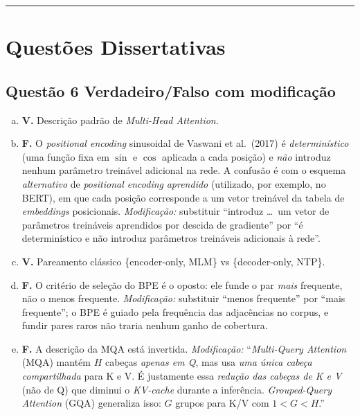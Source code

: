 \documentclass[11pt,a4paper]{article}
\begin{document}
\color{black}
\rule{\linewidth}{0.4pt}

\section*{Questões Dissertativas}

\color{blue}

\subsection*{Questão 6 \textemdash{} Verdadeiro/Falso com modificação}

\begin{enumerate}[a)]
    \item \textbf{V.} Descrição padrão de \textit{Multi-Head Attention}.

    \item \textbf{F.} O \textit{positional encoding} sinusoidal de Vaswani et al.\ (2017) é \emph{determinístico} (uma função fixa em $\sin$ e $\cos$ aplicada a cada posição) e \emph{não} introduz nenhum parâmetro treinável adicional na rede. A confusão é com o esquema \emph{alternativo} de \textit{positional encoding} \emph{aprendido} (utilizado, por exemplo, no BERT), em que cada posição corresponde a um vetor treinável da tabela de \textit{embeddings} posicionais. \textit{Modificação:} substituir ``introduz \ldots\ um vetor de parâmetros treináveis aprendidos por descida de gradiente'' por ``é determinístico e não introduz parâmetros treináveis adicionais à rede''.

    \item \textbf{V.} Pareamento clássico \{encoder-only, MLM\} vs \{decoder-only, NTP\}.

    \item \textbf{F.} O critério de seleção do BPE é o oposto: ele funde o par \emph{mais} frequente, não o menos frequente. \textit{Modificação:} substituir ``menos frequente'' por ``mais frequente''; o BPE é guiado pela frequência das adjacências no corpus, e fundir pares raros não traria nenhum ganho de cobertura.

    \item \textbf{F.} A descrição da MQA está invertida. \textit{Modificação:} ``\textit{Multi-Query Attention} (MQA) mantém $H$ cabeças \emph{apenas em Q}, mas usa \emph{uma única cabeça compartilhada} para K e V. É justamente essa \emph{redução das cabeças de K e V} (não de Q) que diminui o \textit{KV-cache} durante a inferência. \textit{Grouped-Query Attention} (GQA) generaliza isso: $G$ grupos para K/V com $1 < G < H$.''
\end{enumerate}
\end{document}
